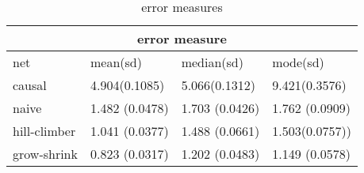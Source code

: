\begin{table}[h]
\begin{tabular}{ l l l l }
 \hline
 \multicolumn{4}{c}{error measure} \\
 \hline
 net & mean(sd) & median(sd) & mode(sd) \\
 \hline
 causal   & 4.904(0.1085)    & 5.066(0.1312)  & 9.421(0.3576)\\
 naive   & 1.482 (0.0478)     & 1.703 (0.0426)& 1.762 (0.0909)\\
 hill-climber   & 1.041 (0.0377)     & 1.488 (0.0661) & 1.503(0.0757))\\
 grow-shrink   & 0.823  (0.0317)   & 1.202 (0.0483) & 1.149 (0.0578)\\
 
\end{tabular}
\caption[errors]{error measures}
\label{tab:4}
\end{table}